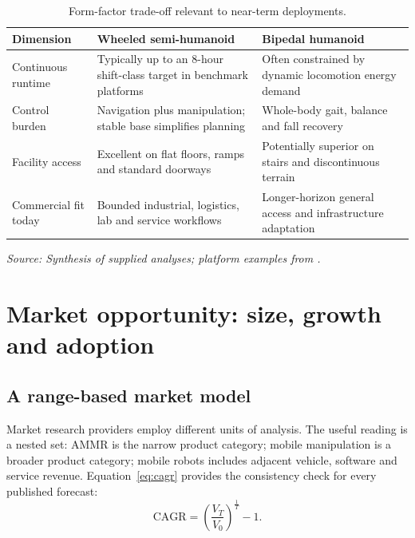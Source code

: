 \documentclass[11pt,a4paper]{article}
\newcommand{\source}[1]{\par\vspace{-0.25em}\footnotesize\color{gray}\emph{Source: #1}\normalsize}
\begin{document}
\begin{table}[ht]
\centering\small
\caption{Form-factor trade-off relevant to near-term deployments.}
\begin{tabularx}{\textwidth}{@{}lYY@{}}
\toprule
Dimension & Wheeled semi-humanoid & Bipedal humanoid \\
\midrule
Continuous runtime & Typically up to an 8-hour shift-class target in benchmark platforms & Often constrained by dynamic locomotion energy demand \\
Control burden & Navigation plus manipulation; stable base simplifies planning & Whole-body gait, balance and fall recovery \\
Facility access & Excellent on flat floors, ramps and standard doorways & Potentially superior on stairs and discontinuous terrain \\
Commercial fit today & Bounded industrial, logistics, lab and service workflows & Longer-horizon general access and infrastructure adaptation \\
\bottomrule
\end{tabularx}
\source{Synthesis of supplied analyses; platform examples from \cite{stretchpaper,reachy}.}
\end{table}

\section{Market opportunity: size, growth and adoption}

\subsection{A range-based market model}

Market research providers employ different units of analysis. The useful reading is a nested set: AMMR is the narrow product category; mobile manipulation is a broader product category; mobile robots includes adjacent vehicle, software and service revenue. Equation~\ref{eq:cagr} provides the consistency check for every published forecast:
\begin{equation}
 \mathrm{CAGR}=\left(\frac{V_T}{V_0}\right)^{\frac{1}{T}}-1.
 \label{eq:cagr}
\end{equation}
\end{document}
